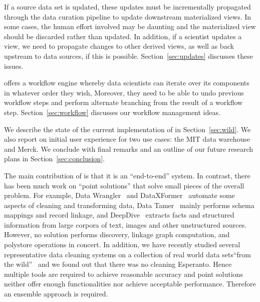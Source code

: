 \stitle{[Updates.]}  
If a source data set is updated, these updates must be incrementally propagated through the data curation pipeline to update downstream materialized views. 
In some cases, the human effort involved may be daunting and the materialized view should be discarded rather than updated. 
In addition, if a scientist updates a view, we need to propagate changes to other derived views, as well as back upstream to data sources, if this is possible. Section~\ref{sec:updates} discusses these  issues.



\stitle{[Workflow.]} 
\dcv offers a workflow engine whereby data scientists can iterate over its components in whatever order they wish,  Moreover, they need to be able to undo previous workflow steps and perform alternate branching from the result of a workflow step.  Section~\ref{sec:workflow} discusses our workflow management ideas.

\smallskip

We describe the state of the current implementation of \dcv in Section~\ref{sec:wild}. We also report on initial user experience for two use cases: the MIT data warehouse and Merck. We conclude with final remarks and an outline of our future research plans in Section~\ref{sec:conclusion}.

\smallskip
The main contribution of \dcv is that it is an ``end-to-end'' system. In contrast, there has been much work on ``point solutions'' that solve small pieces of the overall problem. For example, Data Wrangler~\cite{2011-wrangler} and DataXFormer~\cite{DBLP:conf/icde/AbedjanMIOPS16} automate some aspects of cleaning and transforming data, Data Tamer~\cite{DBLP:conf/cidr/StonebrakerBIBCZPX13} mainly performs schema mappings and record linkage, and DeepDive~\cite{DBLP:journals/pvldb/ShinWWSZR15} extracts facts and structured information from large corpora of text, images and other unstructured sources. However, no solution performs  discovery, linkage graph computation, and polystore operations in concert. In addition, we have recently studied several representative data cleaning systems on a collection of real world data sets``from the wild''~\cite{DBLP:journals/pvldb/AbedjanCDFIOPST16} and we found out that there was no cleaning Esperanto. Hence multiple tools are required to achieve reasonable accuracy and point solutions neither offer enough functionalities nor achieve acceptable performance. Therefore an ensemble approach is required.

